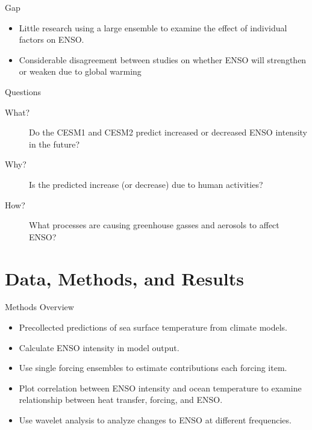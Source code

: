 \documentclass{beamer}
\begin{document}
\begin{frame}{Gap}
  \begin{itemize}
  \item Little research using a large ensemble to examine the effect of individual factors on ENSO.
  \item Considerable disagreement between studies on whether ENSO will strengthen or weaken due to global warming
  \end{itemize}
\end{frame}

\begin{frame}{Questions}
  \begin{description}
  \item[What?] Do the CESM1 and CESM2 predict increased or decreased ENSO intensity in the future?
  \item[Why?] Is the predicted increase (or decrease) due to human activities?
  \item[How?] What processes are causing greenhouse gasses and aerosols to affect ENSO?
  \end{description}
\end{frame}

\section{Data, Methods, and Results}

\begin{frame}{Methods Overview}
  \begin{itemize}
  \item Precollected predictions of sea surface temperature from climate models.
  \item Calculate ENSO intensity in model output.
  \item Use single forcing ensembles to estimate contributions each forcing item.
  \item Plot correlation between ENSO intensity and ocean temperature to examine relationship between heat transfer, forcing, and ENSO.
  \item Use wavelet analysis to analyze changes to ENSO at different frequencies.
  \end{itemize}
\end{frame}
\end{document}
